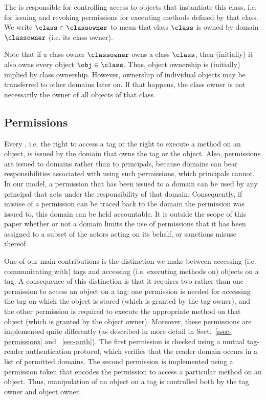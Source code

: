 The  is responsible for
controlling access to objects that instantiate this class,
i.e. for issuing and revoking permissions for executing methods defined by that
class. 
We write $\class \in \classowner$ to mean that class $\class$ is owned
by domain $\classowner$ (i.e. its class owner). 


Note that if a class owner $\classowner$ owns a class $\class$, then
(initially) it also owns every object $\obj \in \class$.  Thus, object
ownership is (initially) implied by class ownership.  However, ownership of
individual objects may be transferred to other domains later on. 
If that happens, the class owner is not necessarily the owner of all objects
of that class.

\subsection{Permissions}

Every , i.e. the right to access a tag or the right to execute
a method on an object, is issued by the domain that owns the tag or the
object. Also, permissions are issued to domains rather than to principals,
because domains can bear responsibilities associated with using such
permissions, which principals cannot. In our model, a permission that has been
issued to a domain can be used by any principal that acts under the
responsibility of that domain. Consequently, if misuse of a permission can be
traced back to the domain the permission was issued to, this domain can be held
accountable. 
It is outside the scope of this paper whether or not 
a domain limits the use of permissions that it has been assigned 
to a subset of the actors acting on its behalf, or sanctions misuse thereof.

One of our main contributions is the distinction we make between accessing
(i.e. communicating with) tags and accessing (i.e. executing methods on)
objects on a tag. A consequence of this distinction is that it requires two
rather than one permission to access an object on a tag: one permission is
needed for accessing the tag on which the object is stored (which is granted by
the tag owner), and the other
permission is required to execute the appropriate method on that object (which
is granted by the object owner). 
Moreover, these permissions are implemented quite differently (as described in
more detail in Sect.~\ref{ssec-permissions} and ~\ref{sec-auth}). The first permission
is checked using a mutual tag-reader authentication protocol, which verifies
that the reader domain occurs in a list of permitted domains. The second
permission is implemented using a permission token that encodes the permission
to access a particular method on an object. Thus,
manipulation of an object on a tag is controlled both by the tag owner and
object owner.

